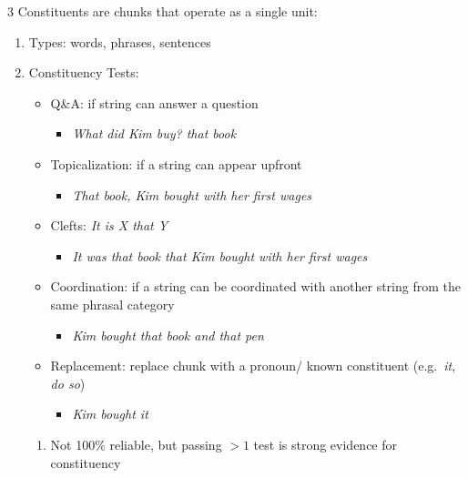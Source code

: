 \documentclass[12pt, a4paper]{article}
\begin{document}
\begin{multicols*}{3}
Constituents are chunks that operate as a single unit:
\begin{enumerate}[\roman*.]
  \item Types: words, phrases, sentences
  \item Constituency Tests: 
    \begin{itemize}[leftmargin=*]\vspace{3pt}
      \item Q\&A: if string can answer a question
      \begin{itemize}[leftmargin=*]\vspace{2pt}
        \item \textit{What did Kim buy? that book}
      \end{itemize}
      \item Topicalization: if a string can appear upfront 
      \begin{itemize}[leftmargin=*]\vspace{2pt}
        \item \textit{That book, Kim bought with her first wages}
      \end{itemize}
      \item Clefts: \textit{It is X that Y}
      \begin{itemize}[leftmargin=*]\vspace{2pt}
        \item \textit{It was that book that Kim bought with her first wages} 
      \end{itemize}
      \item Coordination: if a string can be coordinated with another string from the same phrasal category
      \begin{itemize}[leftmargin=*]\vspace{2pt}
        \item \textit{Kim bought that book and that pen}
      \end{itemize}
      \item Replacement: replace chunk with a pronoun/ known constituent (e.g.\ \textit{it}, \textit{do so})
      \begin{itemize}[leftmargin=*]\vspace{2pt}
        \item \textit{Kim bought it}
      \end{itemize}
    \end{itemize}
    \begin{enumerate}[leftmargin=*, label=$-$]\vspace{5pt}
      \item Not 100\% reliable, but passing $>1$ test is strong evidence for constituency
    \end{enumerate}
\end{enumerate}


\end{multicols*}
\end{document}
